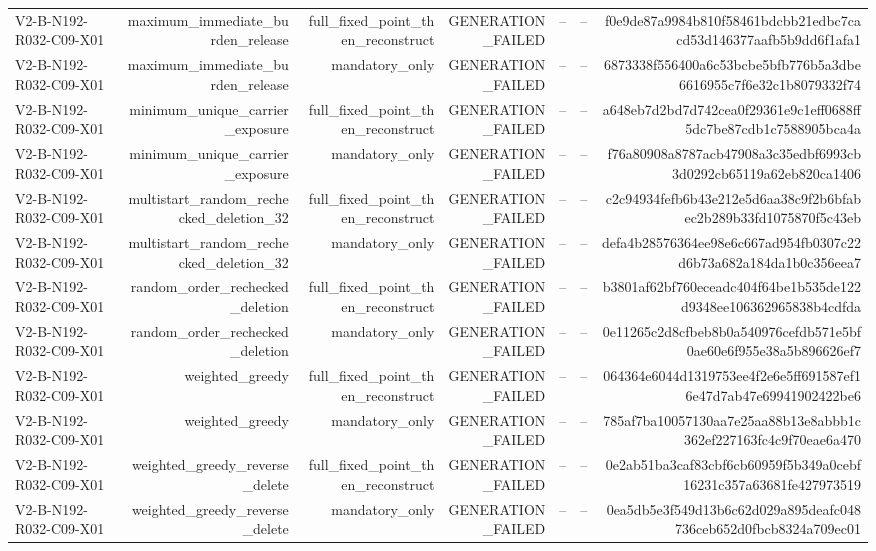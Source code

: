 {\begin{longtable}{lrrrrrr}
V2-B-N192-R032-C09-X01 & maximum\_immediate\_burden\_release & full\_fixed\_point\_then\_reconstruct & GENERATION\_FAILED & -- & -- & f0e9de87a9984b810f58461bdcbb21edbc7cacd53d146377aafb5b9dd6f1afa1 \\
V2-B-N192-R032-C09-X01 & maximum\_immediate\_burden\_release & mandatory\_only & GENERATION\_FAILED & -- & -- & 6873338f556400a6c53bcbe5bfb776b5a3dbe6616955c7f6e32c1b8079332f74 \\
V2-B-N192-R032-C09-X01 & minimum\_unique\_carrier\_exposure & full\_fixed\_point\_then\_reconstruct & GENERATION\_FAILED & -- & -- & a648eb7d2bd7d742cea0f29361e9c1eff0688ff5dc7be87cdb1c7588905bca4a \\
V2-B-N192-R032-C09-X01 & minimum\_unique\_carrier\_exposure & mandatory\_only & GENERATION\_FAILED & -- & -- & f76a80908a8787acb47908a3c35edbf6993cb3d0292cb65119a62eb820ca1406 \\
V2-B-N192-R032-C09-X01 & multistart\_random\_rechecked\_deletion\_32 & full\_fixed\_point\_then\_reconstruct & GENERATION\_FAILED & -- & -- & c2c94934fefb6b43e212e5d6aa38c9f2b6bfabec2b289b33fd1075870f5c43eb \\
V2-B-N192-R032-C09-X01 & multistart\_random\_rechecked\_deletion\_32 & mandatory\_only & GENERATION\_FAILED & -- & -- & defa4b28576364ee98e6c667ad954fb0307c22d6b73a682a184da1b0c356eea7 \\
V2-B-N192-R032-C09-X01 & random\_order\_rechecked\_deletion & full\_fixed\_point\_then\_reconstruct & GENERATION\_FAILED & -- & -- & b3801af62bf760eceadc404f64be1b535de122d9348ee106362965838b4cdfda \\
V2-B-N192-R032-C09-X01 & random\_order\_rechecked\_deletion & mandatory\_only & GENERATION\_FAILED & -- & -- & 0e11265c2d8cfbeb8b0a540976cefdb571e5bf0ae60e6f955e38a5b896626ef7 \\
V2-B-N192-R032-C09-X01 & weighted\_greedy & full\_fixed\_point\_then\_reconstruct & GENERATION\_FAILED & -- & -- & 064364e6044d1319753ee4f2e6e5ff691587ef16e47d7ab47e69941902422be6 \\
V2-B-N192-R032-C09-X01 & weighted\_greedy & mandatory\_only & GENERATION\_FAILED & -- & -- & 785af7ba10057130aa7e25aa88b13e8abbb1c362ef227163fc4c9f70eae6a470 \\
V2-B-N192-R032-C09-X01 & weighted\_greedy\_reverse\_delete & full\_fixed\_point\_then\_reconstruct & GENERATION\_FAILED & -- & -- & 0e2ab51ba3caf83cbf6cb60959f5b349a0cebf16231c357a63681fe427973519 \\
V2-B-N192-R032-C09-X01 & weighted\_greedy\_reverse\_delete & mandatory\_only & GENERATION\_FAILED & -- & -- & 0ea5db5e3f549d13b6c62d029a895deafc048736ceb652d0fbcb8324a709ec01 \\

\end{longtable}}
